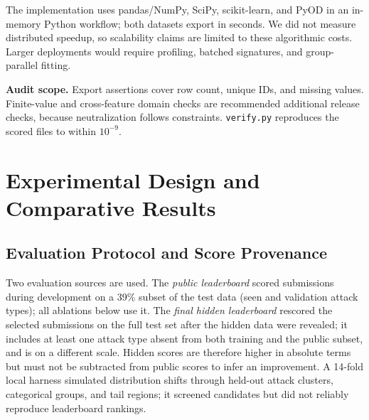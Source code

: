 \documentclass[10pt,a4paper]{article}
\begin{document}
The implementation uses pandas/NumPy, SciPy, scikit-learn, and PyOD in an in-memory Python workflow; both datasets export in seconds. We did not measure distributed speedup, so scalability claims are limited to these algorithmic costs. Larger deployments would require profiling, batched signatures, and group-parallel fitting.

\textbf{Audit scope.} Export assertions cover row count, unique IDs, and missing values. Finite-value and cross-feature domain checks are recommended additional release checks, because neutralization follows constraints. \texttt{verify.py} reproduces the scored files to within $10^{-9}$.

\section{Experimental Design and Comparative Results}\label{sec:exp}
\subsection{Evaluation Protocol and Score Provenance}
Two evaluation sources are used. The \emph{public leaderboard} scored submissions during development on a 39\% subset of the test data (seen and validation attack types); all ablations below use it. The \emph{final hidden leaderboard} rescored the selected submissions on the full test set after the hidden data were revealed; it includes at least one attack type absent from both training and the public subset, and is on a different scale. Hidden scores are therefore higher in absolute terms but must not be subtracted from public scores to infer an improvement. A 14-fold local harness simulated distribution shifts through held-out attack clusters, categorical groups, and tail regions; it screened candidates but did not reliably reproduce leaderboard rankings.
\end{document}
